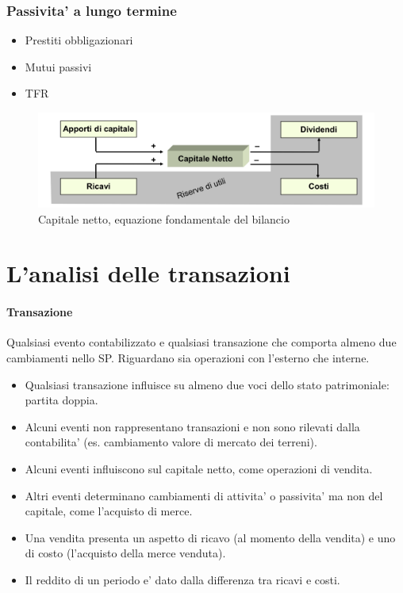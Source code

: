 \documentclass{report}
\begin{document}
	\subsubsection{Passivita' a lungo termine}
	\begin{itemize}
		\item Prestiti obbligazionari
		\item Mutui passivi
		\item TFR
	\end{itemize}
	\begin{figure}[h]
		\centering
		\includegraphics[width=0.7\linewidth]{capitale-netto}
		\caption{Capitale netto, equazione fondamentale del bilancio}
		\label{fig:capitale-netto}
	\end{figure}
	\section{L'analisi delle transazioni}
	\paragraph{Transazione} Qualsiasi evento contabilizzato e qualsiasi transazione che comporta almeno due cambiamenti nello SP. Riguardano sia operazioni con l'esterno che interne.
	\medskip \\
	\begin{itemize}
		\item Qualsiasi transazione influisce su almeno due voci dello stato patrimoniale: partita doppia.
		\item Alcuni eventi non rappresentano transazioni e non sono rilevati dalla contabilita' (es. cambiamento valore di mercato dei terreni).
		\item Alcuni eventi influiscono sul capitale netto, come operazioni di vendita.
		\item Altri eventi determinano cambiamenti di attivita' o passivita' ma non del capitale, come l'acquisto di merce.
		\item Una vendita presenta un aspetto di ricavo (al momento della vendita) e uno di costo (l'acquisto della merce venduta).
		\item Il reddito di un periodo e' dato dalla differenza tra ricavi e costi.
	\end{itemize}
\end{document}
